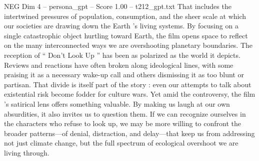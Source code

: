 \begin{textsample}{NEG Dim 4 – persona\_gpt – Score 1.00 – t212\_gpt.txt}
That includes the intertwined pressures of population, consumption, and the sheer scale at which our societies are drawing down the Earth ’s living systems.
By focusing on a single catastrophic object hurtling toward Earth, the film opens space to reflect on the many interconnected ways we are overshooting planetary boundaries.
The reception of “ Don't Look Up ” has been as polarized as the world it depicts.
Reviews and reactions have often broken along ideological lines, with some praising it as a necessary wake-up call and others dismissing it as too blunt or partisan.
That divide is itself part of the story : even our attempts to talk about existential risk become fodder for culture wars.
Yet amid the controversy, the film ’s satirical lens offers something valuable.
By making us laugh at our own absurdities, it also invites us to question them.
If we can recognize ourselves in the characters who refuse to look up, we may be more willing to confront the broader patterns—of denial, distraction, and delay—that keep us from addressing not just climate change, but the full spectrum of ecological overshoot we are living through.

\end{textsample}
